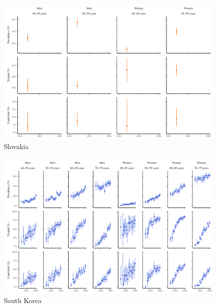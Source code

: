 \documentclass[12pt]{article}
\begin{document}
\begin{appendix}
\begin{refsection}
\begin{landscape}
        \begin{figure}[H]
            \centering
            \includegraphics[width=\linewidth]{../3_figures/countries/fig_slovakia.pdf}
            \caption{Slovakia}
            \label{fig:slovakia}
        \end{figure}

        \begin{figure}[H]
            \centering
            \includegraphics[width=\linewidth]{../3_figures/countries/fig_south korea.pdf}
            \caption{South Korea}
            \label{fig:korea}
        \end{figure}


\end{landscape}
\end{refsection}
\end{appendix}
\end{document}
